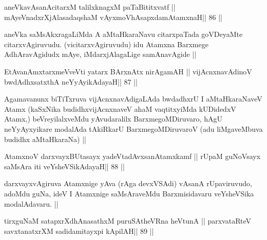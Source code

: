 \begin{shl}
aneVkavAsanAcitarxM talilxknagxM paTaBititxvatf ||
mAyeVnadxrXjAlasadaqshaM vAyxmoVhAsapxdamAtamxnaH\hfill || 86 ||
\end{shl}

\begin{artha}
aneVka saMsAkxragaLiMda A aMtaHkaraNavu citarxpaTada goVDeyaMte
citarxvAgiruvudu. (vicitarxvAgiruvudu) idu Atamxna Barxmege
AdhAravAgidudx mAye, iMdarxjAlagaLige samAnavAgide ||
\end{artha}



\begin{shl}
EtAvanAmxtarxmeVveVti yatarx BArxnAtx nirAgamAH ||
vijAcnxnavAdinoV bwdAdhxsatxthA neYyAyikAdayaH\hfill || 87 ||
\end{shl}

\begin{artha}
Agamavanunx biTiTxruva vijAcnxnavAdigaLAda bwdadhxrU I aMtaHkaraNaveV
Atamx (kaSxNika budidhxvijAcnxnaveV ahaM vaqtitxyiMda kUDidedxV Atamx,)
beVreyilalxveMdu yAvudaralilx BarxmegoMDiruvaro, hAgU neYyAyxyikare
modalAda tAkiRkarU BarxmegoMDiruvaroV (adu liMgaveMbuva budidhx
aMtaHkaraNa) ||
\end{artha}


\begin{shl}
AtamxnoV darxvayxBUtasayx yadeVtadAvxsanAtamxkamf ||
rUpaM guNoV\s sayx saMsAra iti veYsheVSikAdayaH\hfill || 88 ||
\end{shl}

\begin{artha}
darxvayxvAgiruva Atamxnige yAva (rAga devxVSAdi) vAsanA rUpaviruvudo,
adoMdu guNa, ideV I Atamxnige saMsAraveMdu Barxmisidavaru veYsheVSika
modalAdavaru. || 
\end{artha}


\begin{shl}
tirxguNaM satapxrXdhAnasathxM puruSAtheVRna heVtunA ||
parxvataRteV savxtanatxrXM sadidamitayxpi kApilAH\hfill || 89 ||
\end{shl}

